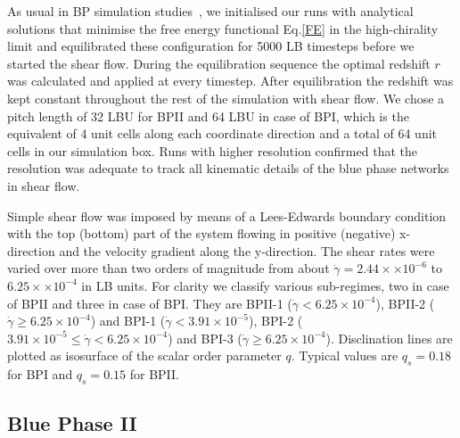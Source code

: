 \documentclass[aps,pre,reprint,superscriptaddress, twocolumn]{revtex4}
\newcommand{\e}[1]{\times10^{#1}}
\newcommand{\gd}{\dot{\gamma}}
\begin{document}
As usual in BP simulation studies~\cite{Henrich:2011a,Henrich:2010b}, we initialised our runs with 
analytical solutions that minimise the free energy functional Eq.\ref{FE} in the high-chirality limit 
and equilibrated these configuration for 5000 LB timesteps before we started the shear flow. 
During the equilibration sequence the optimal redshift $r$ was calculated and applied at every timestep.
After equilibration the redshift was kept constant throughout the rest of the simulation with shear flow.
We chose a pitch length of 32 LBU for BPII and 64 LBU in case of BPI, which is the equivalent 
of 4 unit cells along each coordinate direction and a total of 64 unit cells in our simulation box.
Runs with higher resolution confirmed that the resolution was adequate to track  
all kinematic details of the blue phase networks in shear flow.

Simple shear flow was imposed by means of a Lees-Edwards boundary condition ~\cite{Wagner:2002} with
the top (bottom) part of the system flowing in positive (negative) x-direction and the 
velocity gradient along the y-direction.
The shear rates were varied over more than two orders of magnitude from about 
$\gd=2.44\times \e{-6}$ to $6.25\times\e{-4}$ in LB units.
For clarity we classify various sub-regimes, two in case of BPII and three in case of BPI. 
They are BPII-1 ($\gd < 6.25\e{-4}$), BPII-2 ($\gd\ge 6.25\e{-4}$) and
BPI-1 ($\gd < 3.91\e{-5}$), BPI-2 ($3.91\e{-5}\le\gd< 6.25\e{-4}$) and BPI-3 ($\gd\ge 6.25\e{-4}$). 
Disclination lines are plotted as isosurface of the scalar order parameter $q$. Typical values 
are $q_s=0.18$ for BPI and $q_s=0.15$ for BPII.


\subsection{Blue Phase II}
\end{document}
